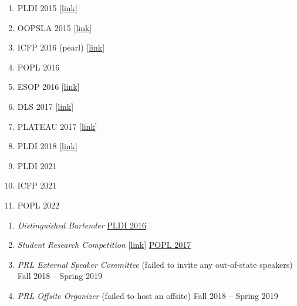 \documentclass{article}
\begin{document}

\begin{enumerate}
\item PLDI 2015 [\href{http://ccs.neu.edu/home/types/cv/failures/pldi-2015-reject.pdf}{link}]
\item OOPSLA 2015 [\href{http://ccs.neu.edu/home/types/cv/failures/oopsla-2015-reject.pdf}{link}]
\item ICFP 2016 (pearl) [\href{http://ccs.neu.edu/home/types/cv/failures/icfp-2016-reject.pdf}{link}]
\item POPL 2016
\item ESOP 2016 [\href{http://ccs.neu.edu/home/types/resources/type-tailoring.pdf}{link}]
\item DLS 2017 [\href{http://ccs.neu.edu/home/types/resources/dls-2017-reject.pdf}{link}]
\item PLATEAU 2017 [\href{http://ccs.neu.edu/home/types/cv/failures/plateau-2017-reject.pdf}{link}]
\item PLDI 2018 [\href{http://ccs.neu.edu/home/types/cv/failures/pldi-2018-reject.pdf}{link}]
\item PLDI 2021 %
\item ICFP 2021 %
\item POPL 2022 %
\end{enumerate}

\begin{enumerate}
\item \emph{Distinguished Bartender} \hfill \href{http://conf.researchr.org/home/PLDI-2016}{PLDI 2016}
\item \emph{Student Research Competition} [\href{http://ccs.neu/home/types/cv/failures/src-2017-reject.pdf}{link}] \hfill \href{https://popl17.sigplan.org/track/POPL-2017-src}{POPL 2017}
\item \emph{PRL External Speaker Committee} (failed to invite any out-of-state speakers)  \hfill {Fall 2018 -- Spring 2019}
\item \emph{PRL Offsite Organizer} (failed to host an offsite) \hfill {Fall 2018 -- Spring 2019}
\end{enumerate}
\end{document}
